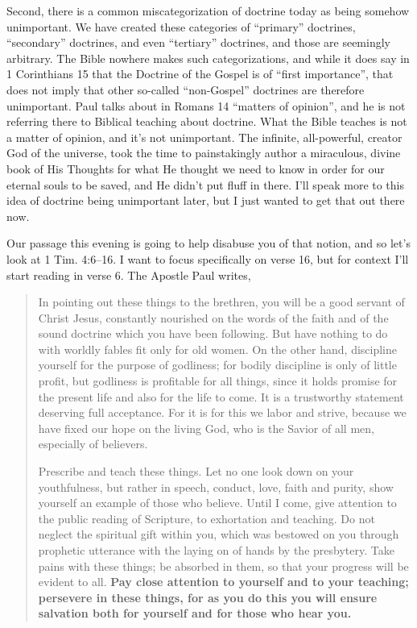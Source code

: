 \documentclass[letterpaper, 12pt]{article}
\begin{document}
    Second, there is a common miscategorization of doctrine today as
    being somehow unimportant. We have created these categories of
    ``primary'' doctrines, ``secondary'' doctrines, and even
    ``tertiary'' doctrines, and those are seemingly arbitrary. The Bible
    nowhere makes such categorizations, and while it does say in 1
    Corinthians 15 that the Doctrine of the Gospel is of ``first
    importance'', that does not imply that other so-called
    ``non-Gospel'' doctrines are therefore unimportant. Paul talks about
    in Romans 14 ``matters of opinion'', and he is not referring there
    to Biblical teaching about doctrine. What the Bible teaches is not a
    matter of opinion, and it's not unimportant. The infinite,
    all-powerful, creator God of the universe, took the time to
    painstakingly author a miraculous, divine book of His Thoughts for
    what He thought we need to know in order for our eternal souls to be
    saved, and He didn't put fluff in there. I'll speak more to this
    idea of doctrine being unimportant later, but I just wanted to get
    that out there now.

    Our passage this evening is going to help disabuse you of that
    notion, and so let's look at 1 Tim. 4:6--16. I want to focus
    specifically on verse 16, but for context I'll start reading in
    verse 6. The Apostle Paul writes,

    \begin{quote}

        In pointing out these things to the brethren, you will be a good
        servant of Christ Jesus, constantly nourished on the words of
        the faith and of the sound doctrine which you have been
        following. But have nothing to do with worldly fables fit only
        for old women. On the other hand, discipline yourself for the
        purpose of godliness; for bodily discipline is only of little
        profit, but godliness is profitable for all things, since it
        holds promise for the present life and also for the life to
        come. It is a trustworthy statement deserving full acceptance.
        For it is for this we labor and strive, because we have fixed
        our hope on the living God, who is the Savior of all men,
        especially of believers.

        Prescribe and teach these things. Let no one look down on your
        youthfulness, but rather in speech, conduct, love, faith and
        purity, show yourself an example of those who believe. Until I
        come, give attention to the public reading of Scripture, to
        exhortation and teaching. Do not neglect the spiritual gift
        within you, which was bestowed on you through prophetic
        utterance with the laying on of hands by the presbytery. Take
        pains with these things; be absorbed in them, so that your
        progress will be evident to all. \textbf{Pay close attention to
        yourself and to your teaching; persevere in these things, for as
        you do this you will ensure salvation both for yourself and for
        those who hear you.}

    \end{quote}
\end{document}
